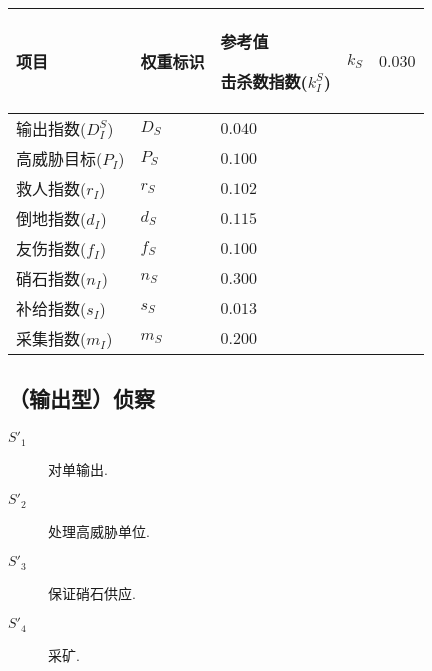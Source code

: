 \documentclass{ctexart}
\begin{document}
\begin{longtable}{|>{\centering\arraybackslash}p{8em}|>{\centering\arraybackslash}p{4em}|>{\centering\arraybackslash}p{6em}|}
    \hline

    项目             & 权重标识  & 参考值     \endhead

    \hline

    击杀数指数($k_I^S$) & $k_S$ & $0.030$          \\

    \hline

    输出指数($D_I^S$)  & $D_S$ & $0.040$          \\

    \hline

    高威胁目标($P_I$)   & $P_S$ & $0.100$          \\

    \hline

    救人指数($r_I$)    & $r_S$ & $0.102$          \\

    \hline

    倒地指数($d_I$)    & $d_S$ & $0.115$          \\

    \hline

    友伤指数($f_I$)    & $f_S$ & $0.100$          \\

    \hline

    硝石指数($n_I$)    & $n_S$ & $0.300$          \\

    \hline

    补给指数($s_I$)    & $s_S$ & $0.013$          \\

    \hline

    采集指数($m_I$)    & $m_S$ & $0.200$          \\

    \hline
\end{longtable}


\subsection{（输出型）侦察}

\begin{description}
    \item[$S'_1$] 对单输出.
    \item[$S'_2$] 处理高威胁单位.
    \item[$S'_3$] 保证硝石供应.
    \item[$S'_4$] 采矿.
\end{description}
\end{document}
